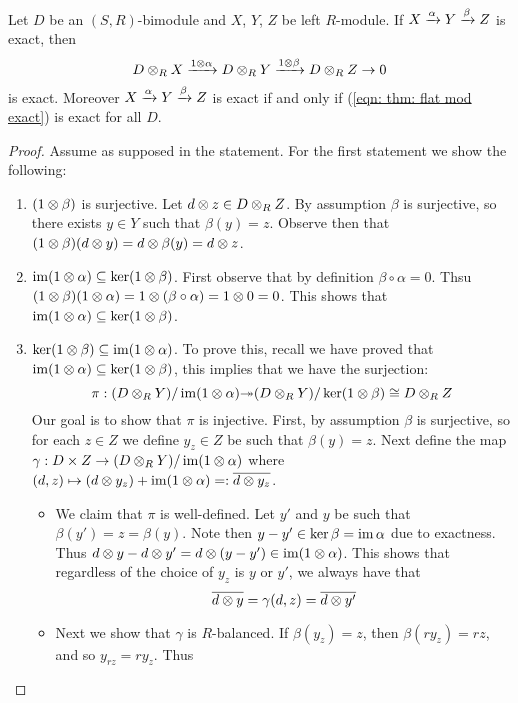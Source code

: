 \begin{thm}
    Let $D$ be an $(S,R)$-bimodule and $X$, $Y$, $Z$ be left $R$-module. If $ X\xrightarrow{\alpha} Y\xrightarrow{\beta} Z$ is exact, then 
    \begin{equation} \label{eqn: thm: flat mod exact}
        D\otimes_R X\xrightarrow{1\otimes \alpha} D\otimes_R Y\xrightarrow{1\otimes\beta} D\otimes_R Z \to 0
    \end{equation}
    is exact. Moreover  $X\xrightarrow{\alpha} Y\xrightarrow{\beta} Z$ is exact if and only if (\ref{eqn: thm: flat mod exact}) is exact for all $D$.
\end{thm}
\begin{proof}
    Assume as supposed in the statement. For the first statement we show the following:
    \begin{enumerate}
        \item $(1\otimes \beta)$ is surjective. Let $d\otimes z\in D\otimes_R Z$. By assumption $\beta$ is surjective, so there exists $y\in Y$ such that $\beta(y) = z$. Observe then that $(1\otimes\beta)(d\otimes y) = d\otimes \beta(y) = d\otimes z$.
        \item $\operatorname{im} (1\otimes \alpha)\subseteq \ker(1\otimes \beta)$. First observe that by definition $\beta\circ \alpha = 0$. Thsu $(1\otimes \beta) (1\otimes\alpha) = 1\otimes (\beta\circ \alpha) = 1\otimes 0 = 0$. This shows that $\operatorname{im}(1\otimes \alpha) \subseteq \ker (1\otimes \beta)$.
        \item $\ker (1\otimes \beta)\subseteq \operatorname{im}(1\otimes \alpha)$. To prove this, recall we have proved that $\operatorname{im}(1\otimes \alpha) \subseteq \ker(1\otimes \beta)$, this implies that we have the surjection: 
        \[\pi: (D\otimes_R Y)/\operatorname{im}(1\otimes \alpha) {\twoheadrightarrow} (D\otimes_R Y)/\ker(1\otimes \beta)\cong D\otimes_R Z\]
        Our goal is to show that $\pi$ is injective. First, by assumption $\beta$ is surjective, so for each $z\in Z$ we define $y_z\in Z$ be such that $\beta(y)=z$. Next define the map $\gamma:D\times Z\to (D\otimes_R Y)/\operatorname{im}(1\otimes\alpha)$ where $(d,z)\mapsto (d\otimes y_z) + \operatorname{im}(1\otimes \alpha) =: \overline{d\otimes y_z}$.
        \begin{itemize}
            \item We claim that $\pi$ is well-defined. Let $y'$ and $y$ be such that $\beta(y') = z = \beta(y)$. Note then $y-y'\in \ker\beta = \operatorname{im}\alpha$ due to exactness. Thus $d\otimes y- d\otimes y' = d\otimes (y-y') \in \operatorname{im}(1\otimes \alpha)$. This shows that regardless of the choice of $y_z$ is $y$ or $y'$, we always have that 
            \[ \overline{d\otimes y}  = \gamma(d,z) = \overline{d\otimes y'}\]
            \item Next we show that $\gamma$ is $R$-balanced. If $\beta(y_z)=z$, then $\beta(ry_z) = rz$, and so $y_{rz} = ry_z$. Thus

\end{itemize}
\end{enumerate}
\end{proof}
